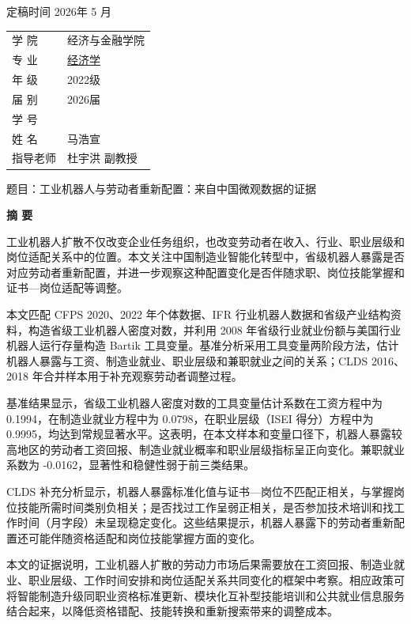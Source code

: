 定稿时间 2026年 5 月

{\def\LTcaptype{none} %
\begin{longtable}[]{@{}
  >{\centering\arraybackslash}p{}
  >{\centering\arraybackslash}p{}@{}}
\toprule\noalign{}
\endhead
\bottomrule\noalign{}
\endlastfoot
学 院 & 经济与金融学院 \\
专 业 & \ul{经济学} \\
年 级 & 2022级 \\
届 别 & 2026届 \\
学 号 & 20224105022 \\
姓 名 & 马浩宣 \\
指导老师 & 杜宇洪 副教授 \\
\end{longtable}
}

题目：工业机器人与劳动者重新配置：来自中国微观数据的证据

\protect{}\label{_Toc1280781355}{}\textbf{摘 要}

工业机器人扩散不仅改变企业任务组织，也改变劳动者在收入、行业、职业层级和岗位适配关系中的位置。本文关注中国制造业智能化转型中，省级机器人暴露是否对应劳动者重新配置，并进一步观察这种配置变化是否伴随求职、岗位技能掌握和证书---岗位适配等调整。

本文匹配 CFPS 2020、2022 年个体数据、IFR 行业机器人数据和省级产业结构资料，构造省级工业机器人密度对数，并利用 2008 年省级行业就业份额与美国行业机器人运行存量构造 Bartik 工具变量。基准分析采用工具变量两阶段方法，估计机器人暴露与工资、制造业就业、职业层级和兼职就业之间的关系；CLDS 2016、2018 年合并样本用于补充观察劳动者调整过程。

基准结果显示，省级工业机器人密度对数的工具变量估计系数在工资方程中为 0.1994，在制造业就业方程中为 0.0798，在职业层级（ISEI 得分）方程中为 0.9995，均达到常规显著水平。这表明，在本文样本和变量口径下，机器人暴露较高地区的劳动者工资回报、制造业就业概率和职业层级指标呈正向变化。兼职就业系数为 -0.0162，显著性和稳健性弱于前三类结果。

CLDS 补充分析显示，机器人暴露标准化值与证书---岗位不匹配正相关，与掌握岗位技能所需时间类别负相关；是否找过工作呈弱正相关，是否参加技术培训和找工作时间（月字段）未呈现稳定变化。这些结果提示，机器人暴露下的劳动者重新配置还可能伴随资格适配和岗位技能掌握方面的变化。

本文的证据说明，工业机器人扩散的劳动力市场后果需要放在工资回报、制造业就业、职业层级、工作时间安排和岗位适配关系共同变化的框架中考察。相应政策可将智能制造升级同职业资格标准更新、模块化互补型技能培训和公共就业信息服务结合起来，以降低资格错配、技能转换和重新搜索带来的调整成本。

